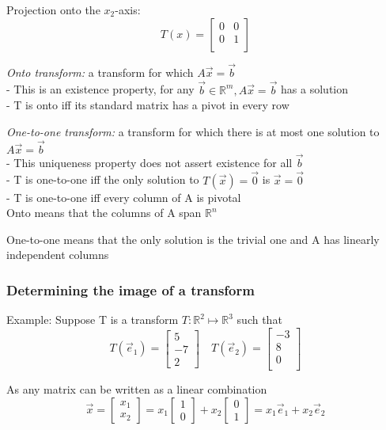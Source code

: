 \documentclass[12pt]{article} %
\newcommand{\R}{\mathbb{R}}
\begin{document}
Projection onto the $x_2$-axis:
$$T(x) = \begin{bmatrix}
	0 & 0\\
	0 & 1\\
\end{bmatrix}$$

 \emph{Onto transform:} a transform for which $A\vec{x} = \vec{b}$\\
 \quad - This is an existence property, for any $\vec{b} \in \R^m, A\vec{x} = \vec{b}$ has a solution\\
 \quad - T is onto iff its standard matrix has a pivot in every row

 \emph{One-to-one transform:} a transform for which there is at most one solution to $ A\vec{x} = \vec{b}$\\
 \quad - This uniqueness property does not assert existence for all $\vec{b}$\\
 \quad - T is one-to-one iff the only solution to $T(\vec{x}) = \vec{0}$ is $\vec{x} = \vec{0}$\\
 \quad - T is one-to-one iff every column of A is pivotal\\

 Onto means that the columns of A span $\R^n$

 One-to-one means that the only solution is the trivial one and A has linearly independent columns

\subsubsection{Determining the image of a transform}
Example: Suppose T is a transform $T: \R^2 \mapsto \R^3$ such that 
$$T(\vec{e}_1) = \begin{bmatrix}
	5\\
	-7\\
	2
\end{bmatrix} \quad T(\vec{e}_2) = \begin{bmatrix}
	-3\\
	8\\
	0\\
\end{bmatrix}$$

As any matrix can be written as a linear combination
$$\vec{x} = \begin{bmatrix}
	x_1 \\ x_2
\end{bmatrix} = x_1 \begin{bmatrix}
	1 \\ 0
\end{bmatrix} + x_2 \begin{bmatrix}
	0 \\ 1
\end{bmatrix} = x_1 \vec{e}_1 + x_2 \vec{e}_2$$
\end{document}
